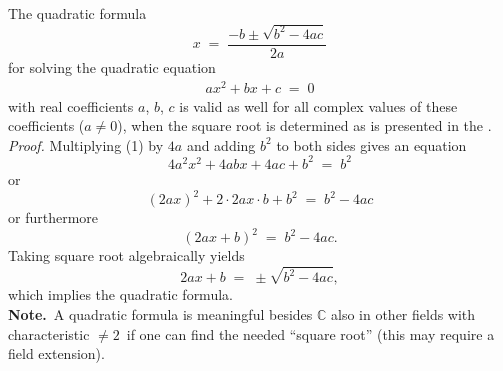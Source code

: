 \documentclass[12pt]{article}
\theoremstyle{definition}
\begin{document}
The quadratic formula
$$x \;=\; \frac{-b\!\pm\!\sqrt{b^2\!-\!4ac}}{2a}$$
for solving the quadratic equation
\begin{align}
ax^2\!+\!bx\!+\!c \;=\; 0
\end{align}
with real coefficients $a$, $b$, $c$ is valid as well for all complex values of these coefficients ($a \neq 0$), when the square root is determined as is presented in the .\\

{\em Proof.}\; Multiplying (1) by $4a$ and adding $b^2$ to both sides gives an  equation
$$4a^2x^2\!+\!4abx\!+\!4ac\!+\!b^2 \;=\; b^2$$
or
$$(2ax)^2\!+\!2\!\cdot\!2ax\!\cdot\!{b}\!+\!b^2 \;=\; b^2\!-\!4ac$$
or furthermore
$$(2ax\!+\!b)^2 \;=\; b^2\!-\!4ac.$$
Taking square root algebraically yields
$$2ax\!+\!b \;=\; \pm\!\sqrt{b^2\!-\!4ac},$$
which implies the quadratic formula.\\


\textbf{Note.}\, A  quadratic formula is meaningful besides $\mathbb{C}$ also in other fields with characteristic $\neq 2$\, if one can find the needed ``square root'' (this may require a field extension).



\end{document}
